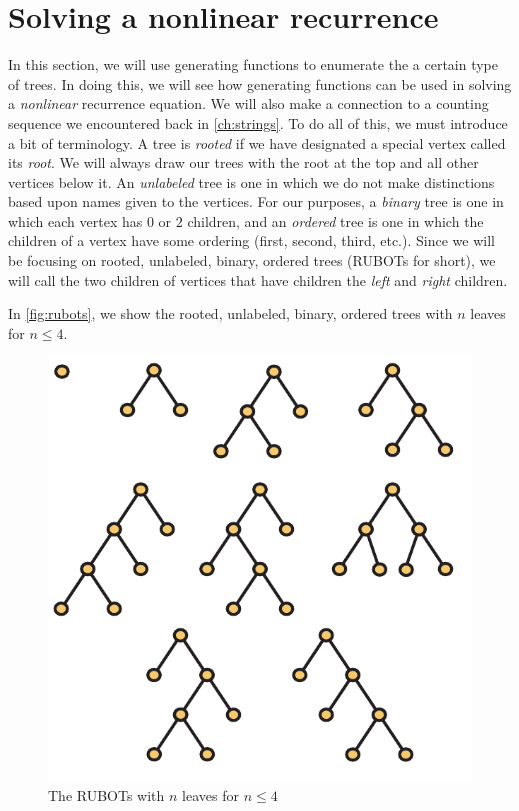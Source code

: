 \section{Solving a nonlinear recurrence}\label{s:recurrence:rubots}

In this section, we will use generating functions to enumerate the a
certain type of trees. In doing this, we will see how generating
functions can be used in solving a \emph{nonlinear} recurrence
equation. We will also make a connection to a counting sequence we
encountered back in \autoref{ch:strings}. To do all of this, we must
introduce a bit of terminology. A tree is \emph{rooted} if we have
designated a special vertex called its \emph{root}. We will always
draw our trees with the root at the top and all other vertices below
it. An \emph{unlabeled} tree is one in which we do not make
distinctions based upon names given to the vertices. For our purposes,
a \emph{binary} tree is one in which each vertex has $0$ or $2$
children, and an \emph{ordered} tree is one in which the children of a
vertex have some ordering (first, second, third, etc.). Since we will
be focusing on rooted, unlabeled, binary, ordered trees (RUBOTs for
short), we will call the two children of vertices that have children
the \emph{left} and \emph{right} children.

In \autoref{fig:rubots}, we show the rooted, unlabeled, binary, ordered
trees with $n$ leaves for $n\leq 4$.

\begin{figure}[h]
  \centering
  \includegraphics{recurrence-figs/RUBOTs}
  \caption{The RUBOTs with $n$ leaves for $n\leq 4$}
  \label{fig:rubots}
\end{figure}

